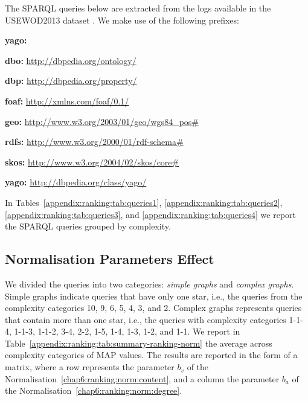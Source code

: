 The SPARQL queries below are extracted from the logs available in the USEWOD2013 dataset \cite{usewod:2013}. We make use of the following prefixes:
\begin{labeling}{\textbf{yago:}}
	\item[\textbf{dbo:}] \url{http://dbpedia.org/ontology/}
	\item[\textbf{dbp:}] \url{http://dbpedia.org/property/}
	\item[\textbf{foaf:}] \url{http://xmlns.com/foaf/0.1/}
	\item[\textbf{geo:}] \url{http://www.w3.org/2003/01/geo/wgs84\_pos#}
	\item[\textbf{rdfs:}] \url{http://www.w3.org/2000/01/rdf-schema#}
	\item[\textbf{skos:}] \url{http://www.w3.org/2004/02/skos/core#}
	\item[\textbf{yago:}] \url{http://dbpedia.org/class/yago/}
\end{labeling}

In Tables~\ref{appendix:ranking:tab:queries1}, \ref{appendix:ranking:tab:queries2}, \ref{appendix:ranking:tab:queries3}, and \ref{appendix:ranking:tab:queries4} we report the SPARQL queries grouped by complexity.









\subsection{Normalisation Parameters Effect}

We divided the queries into two categories: \emph{simple graphs} and \emph{complex graphs}. Simple graphs indicate queries that have only one star, i.e., the queries from the complexity categories 10, 9, 6, 5, 4, 3, and 2. Complex graphs represents queries that contain more than one star, i.e., the queries with complexity categories 1-1-4, 1-1-3, 1-1-2, 3-4, 2-2, 1-5, 1-4, 1-3, 1-2, and 1-1. We report in Table~\ref{appendix:ranking:tab:summary-ranking-norm} the average across complexity categories of MAP values. The results are reported in the form of a matrix, where a row represents the parameter $b_v$ of the Normalisation~\ref{chap6:ranking:norm:content}, and a column the parameter $b_a$ of the Normalisation~\ref{chap6:ranking:norm:degree}.

